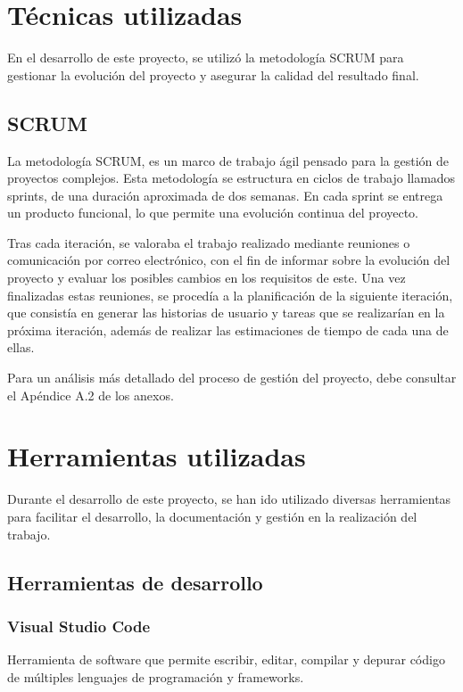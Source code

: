 
\section{Técnicas utilizadas}
\label{sec:Tecnicas}
En el desarrollo de este proyecto, se utilizó la metodología SCRUM para gestionar la evolución del proyecto y asegurar la calidad del resultado final.

\subsection{SCRUM}
\label{subsec:SCRUM}
La metodología SCRUM, es un marco de trabajo ágil pensado para la gestión de proyectos complejos. Esta metodología se estructura en ciclos de trabajo llamados sprints, de una duración aproximada de dos semanas. En cada sprint se entrega un producto funcional, lo que permite una evolución continua del proyecto.

Tras cada iteración, se valoraba el trabajo realizado mediante reuniones o comunicación por correo electrónico, con el fin de informar sobre la evolución del proyecto y evaluar los posibles cambios en los requisitos de este. Una vez finalizadas estas reuniones, se procedía a la planificación de la siguiente iteración, que consistía en generar las historias de usuario y tareas que se realizarían en la próxima iteración, además de realizar las estimaciones de tiempo de cada una de ellas.

Para un análisis más detallado del proceso de gestión del proyecto, debe consultar el Apéndice A.2 de los anexos.

\section{Herramientas utilizadas}
\label{sec:Herramientas}
Durante el desarrollo de este proyecto, se han ido utilizado diversas herramientas para facilitar el desarrollo, la documentación y gestión en la realización del trabajo.

\subsection{Herramientas de desarrollo}
\label{subsec:Desarrollo}

\subsubsection{Visual Studio Code}
\label{subsubsec:VScode}
Herramienta de software que permite escribir, editar, compilar y depurar código de múltiples lenguajes de programación y frameworks.

